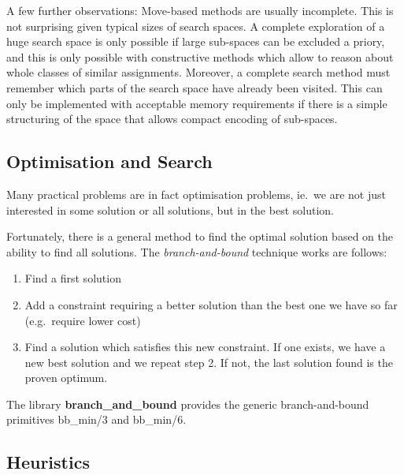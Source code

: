 A few further observations:
Move-based methods are usually incomplete. This is not surprising given
typical sizes of search spaces.
A complete exploration of a huge search space
is only possible if large sub-spaces can be excluded a priory, and this
is only possible with constructive methods which allow to reason about
whole classes of similar assignments.
Moreover, a complete search method must remember which parts of the
search space have already been visited.
This can only be implemented with
acceptable memory requirements if there is a simple structuring of the
space that allows compact encoding of sub-spaces.


\subsection{Optimisation and Search}

Many practical problems are in fact optimisation problems, ie.\ we are
not just interested in some solution or all solutions, but in
the best solution.

Fortunately, there is a general method to find the optimal solution
based on the ability to find all solutions.
The {\em branch-and-bound} technique works are follows:
\begin{enumerate}
\item Find a first solution
\item Add a constraint requiring a better solution than the best
    one we have so far (e.g.\ require lower cost)
\item Find a solution which satisfies this new constraint.
    If one exists, we have a new best solution and we repeat step 2.
    If not, the last solution found is the proven optimum.
\end{enumerate}
The library {\bf branch\_and\_bound} provides the generic
branch-and-bound primitives bb\_min/3 and bb\_min/6.


\subsection{Heuristics}

